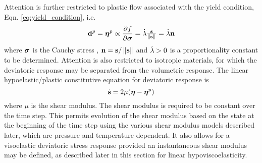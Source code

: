 Attention is further restricted to plastic flow associated with the yield condition,
Eqn. \ref{eq:yield_condition}, i.e.
  \begin{equation}\label{eq:associated_flow}
    \mathbf{d}^p = \boldsymbol{\eta}^p \propto \frac{\displaystyle\partial f}{\displaystyle\partial \boldsymbol{\sigma}} = \dot{\lambda}\tfrac{\mathbf{s}}{\left\lVert\mathbf{s}\right\rVert} = \dot{\lambda}\mathbf{n}
  \end{equation}
where $\boldsymbol{\sigma}$ is the Cauchy stress , $\mathbf{n}={\mathbf{s}/\left\lVert\mathbf{s}\right\rVert}$ and
$\dot{\lambda}>0$ is a proportionality constant to be determined.
Attention is also restricted to isotropic materials, for which the
deviatoric response may be separated from the volumetric response.
The linear hypoelastic/plastic constitutive equation for deviatoric
response is
  \begin{equation}\label{eq:linearhypoelasticity}
    \dot{\mathbf{s}} = 2\mu(\boldsymbol{\eta} - \boldsymbol{\eta}^p)
  \end{equation}
where $\mu$ is the shear modulus.  The shear modulus is required to be
constant over the time step.  This permits evolution of the shear
modulus based on the state at the beginning of the time step using the
various shear modulus models described later, which are pressure and
temperature dependent.  It also allows for a visoelastic deviatoric
stress response provided an instantaneous shear modulus may be
defined, as described later in this section for linear
hypoviscoelasticity.

